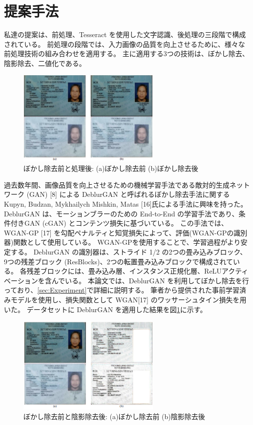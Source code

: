 \documentclass[uplatex, twocolumn,10pt]{jsarticle}
\begin{document}
\section{提案手法}

私達の提案は、前処理、Tesseract を使用した文字認識、後処理の三段階で構成されている。
前処理の段階では、入力画像の品質を向上させるために、様々な前処理技術の組み合わせを適用する。
主に適用する3つの技術は、ぼかし除去、陰影除去、二値化である。

\begin{figure}[t]
    \begin{center}
        \includegraphics*[width=7cm]{image/Figure1.png}
        \caption{ぼかし除去前と処理後: (a)ぼかし除去前 (b)ぼかし除去後}
        \label{fig:Figure1}
    \end{center}
\end{figure}

過去数年間、画像品質を向上させるための機械学習手法である敵対的生成ネットワーク (GAN) [8] による DeblurGAN と呼ばれるぼかし除去手法に関する Kupyn, Budzan, Mykhailych Mishkin, Matas [16]氏による手法に興味を持った。
DeblurGAN は、モーションブラーのための End-to-End の学習手法であり、条件付きGAN (cGAN) とコンテンツ損失に基づいている。
この手法では、WGAN-GP [17] を勾配ペナルティと知覚損失によって、評価(WGAN-GPの識別器)関数として使用している。
WGAN-GPを使用することで、学習過程がより安定する。
DeblurGAN の識別器は、ストライド 1/2 の2つの畳み込みブロック、9つの残差ブロック (ResBlocks)、2つの転置畳み込みブロックで構成されている。
各残差ブロックには、畳み込み層、インスタンス正規化層、ReLUアクティベーションを含んでいる。
本論文では、DeblurGAN を利用してぼかし除去を行っており、\ref{sec:Experiment}で詳細に説明する。
筆者から提供された事前学習済みモデルを使用し、損失関数として WGAN[17] のワッサーシュタイン損失を用いた。
データセットに DeblurGAN を適用した結果を図\ref{fig:Figure1}に示す。

\begin{figure}[t]
    \begin{center}
        \includegraphics*[width=7cm]{image/Figure2.png}
        \caption{ぼかし除去前と陰影除去後: (a)ぼかし除去前 (b)陰影除去後}
        \label{fig:Figure2}
    \end{center}
\end{figure}
\end{document}
